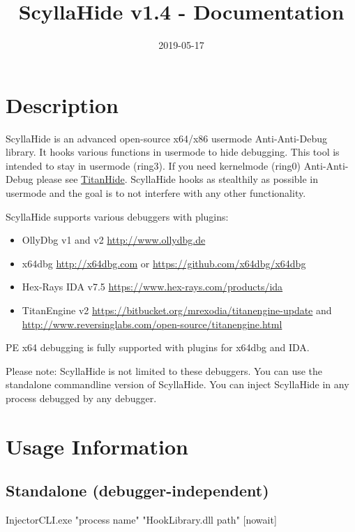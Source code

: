 \documentclass[10pt,a4paper]{article}
\title{ScyllaHide v1.4 - Documentation}
\author{}
\date{2019-05-17}
\begin{document}
\maketitle
 
\tableofcontents
\listoffigures
\lstlistoflistings

\newpage
{}

\section{Description}

ScyllaHide is an advanced open-source x64/x86 usermode Anti-Anti-Debug library. It hooks various functions in usermode to hide debugging. This tool is intended to stay in usermode (ring3). If you need kernelmode (ring0) Anti-Anti-Debug please see \href{https://github.com/mrexodia/TitanHide}{TitanHide}. ScyllaHide hooks as stealthily as possible in usermode and the goal is to not interfere with any other functionality.

ScyllaHide supports various debuggers with plugins:
\begin{itemize}
\item OllyDbg v1 and v2 \url{http://www.ollydbg.de}
\item x64dbg \url{http://x64dbg.com} or \url{https://github.com/x64dbg/x64dbg}
\item Hex-Rays IDA v7.5 \url{https://www.hex-rays.com/products/ida}
\item TitanEngine v2 \url{https://bitbucket.org/mrexodia/titanengine-update} and \url{http://www.reversinglabs.com/open-source/titanengine.html}
\end{itemize}

PE x64 debugging is fully supported with plugins for x64dbg and IDA.

Please note: ScyllaHide is not limited to these debuggers. You can use the standalone commandline version of ScyllaHide. You can inject ScyllaHide in any process debugged by any debugger.

\section{Usage Information}
\subsection{Standalone (debugger-independent)}
InjectorCLI.exe "process name" "HookLibrary.dll path" [nowait]
\end{document}

